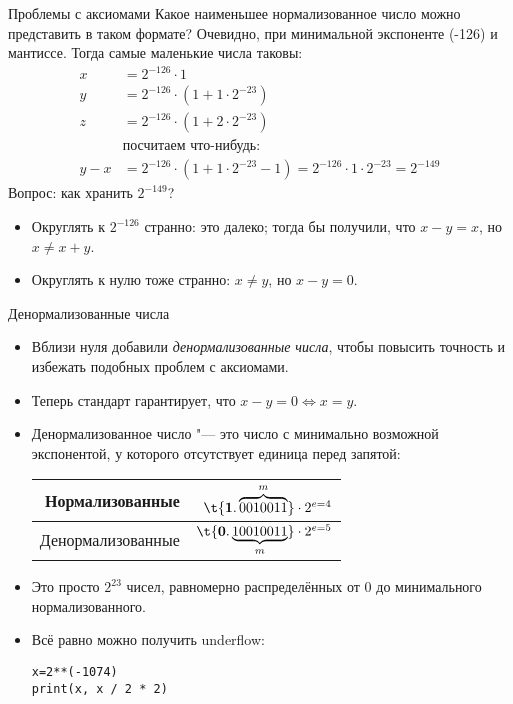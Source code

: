 \begin{frame}{Проблемы с аксиомами}
	Какое наименьшее нормализованное число можно представить в таком формате?
	Очевидно, при минимальной экспоненте (-126) и мантиссе.
	Тогда самые маленькие числа таковы:
	\begin{align*}
		x &= 2^{-126} \cdot 1 \\
		y &= 2^{-126} \cdot (1 + 1 \cdot 2^{-23}) \\
		z &= 2^{-126} \cdot (1 + 2 \cdot 2^{-23}) \\
		& \text{посчитаем что-нибудь:} \\
		y - x &= 2^{-126} \cdot (1 + 1 \cdot 2^{-23} - 1) = 2^{-126} \cdot 1 \cdot 2^{-23} = 2^{-149}
	\end{align*}
	Вопрос: как хранить $2^{-149}$?
	\begin{itemize}
		\item
			Округлять к $2^{-126}$ странно: это далеко; тогда бы получили, что $x-y=x$, но $x\neq x + y$.
		\item
			Округлять к нулю тоже странно: $x \neq y$, но $x - y = 0$.
	\end{itemize}
\end{frame}

\begin{frame}[fragile]{Денормализованные числа}
	\begin{itemize}
		\item 
			Вблизи нуля добавили \textit{денормализованные числа}, чтобы повысить точность и избежать подобных проблем с аксиомами.
		\item
			Теперь стандарт гарантирует, что $x - y = 0 \iff x = y$.
		\item
			Денормализованное число "--- это число с минимально возможной экспонентой, у которого отсутствует единица перед запятой:
			\begin{center}
				\begin{tabular}{r|r}
					Нормализованные   & $\t{\textbf{1}.\overbrace {0010011}^{m}} \cdot 2^{e=4}$ \\\hline
					Денормализованные & $\t{\textbf{0}.\underbrace{10010011}_{m}} \cdot 2^{e=5}$ \\
				\end{tabular}
			\end{center}
		\item
			Это просто $2^{23}$ чисел, равномерно распределённых от 0 до минимального нормализованного.
		\item
			Всё равно можно получить underflow:
\begin{verbatim}
x=2**(-1074)
print(x, x / 2 * 2)
\end{verbatim}
	\end{itemize}
\end{frame}

